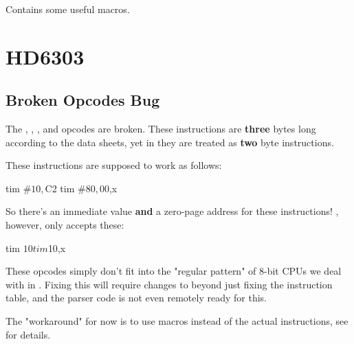 \subsubsection{}
\label{support6502}

Contains some useful macros.

\section{HD6303}

\subsection{Broken Opcodes Bug}
\label{changelog:20200903bug}
The , , , and  opcodes are broken. These instructions are \textbf{three} bytes long according to the data sheets, yet in \dasm they are
treated as \textbf{two} byte instructions.

These instructions are supposed
to work as follows:

\begin{code}
	tim	#$10,$C2
	tim	#$80,$00,x
\end{code}

So there's an immediate value \textbf{and} a zero-page address
for these instructions! \dasm, however, only accepts these:

\begin{code}
	tim	$10
	tim	$10,x
\end{code}

These opcodes simply don't fit into the "regular pattern" of 8-bit CPUs
we deal with in \dasm. Fixing this will require changes to
\dasm beyond just fixing the instruction table, and the parser code is not even remotely ready for this.

The "workaround" for now is to use macros instead of the
actual instructions, see  for
details.

